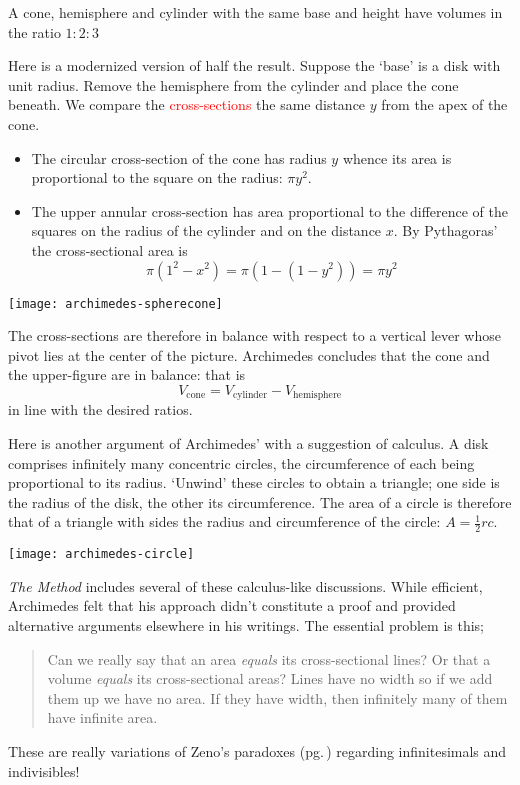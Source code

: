 \begin{thm*}{}{}
	A cone, hemisphere and cylinder with the same base and height have volumes in the ratio $1:2:3$
\end{thm*}
\label{pg:archmethod}

\begin{minipage}[t]{0.67\linewidth}\vspace{0pt}
	Here is a modernized version of half the result.\smallbreak
	Suppose the `base' is a disk with unit radius. Remove the hemisphere from the cylinder and place the cone beneath. We compare the \textcolor{red}{cross-sections} the same distance $y$ from the apex of the cone.
	\begin{itemize}\itemsep0pt
	  \item The circular cross-section of the cone has radius $y$ whence its area is proportional to the square on the radius: $\pi y^2$.
		\item The upper annular cross-section has area proportional to the difference of the squares on the radius of the cylinder and on the distance $x$. By Pythagoras' the cross-sectional area is
		\[
			\pi(1^2-x^2)=\pi(1-(1-y^2))=\pi y^2
		\]
	\end{itemize}
\end{minipage}
\hfill
\begin{minipage}[t]{0.32\linewidth}\vspace{0pt}
	\flushright
	\texttt{[image: archimedes-spherecone]}
\end{minipage}
The cross-sections are therefore in balance with respect to a vertical lever whose pivot lies at the center of the picture. Archimedes concludes that the cone and the upper-figure are in balance: that is
\[
	V_\text{cone}=V_\text{cylinder}-V_\text{hemisphere}
\]
in line with the desired ratios.
\bigbreak


Here is another argument of Archimedes' with a suggestion of calculus. A disk comprises infinitely many concentric circles, the circumference of each being proportional to its radius. `Unwind' these circles to obtain a triangle; one side is the radius of the disk, the other its circumference. The area of a circle is therefore that of a triangle with sides the radius and circumference of the circle: $A=\frac 12rc$.
\begin{center}
	\texttt{[image: archimedes-circle]}
\end{center}

\emph{The Method} includes several of these calculus-like discussions. While efficient, Archimedes felt that his approach didn't constitute a proof and provided alternative arguments elsewhere in his writings. The essential problem is this;
\begin{quote}
  Can we really say that an area \emph{equals} its cross-sectional lines? Or that a volume \emph{equals} its cross-sectional areas? Lines have no width so if we add them up we have no area. If they have width, then infinitely many of them have infinite area.
\end{quote}
These are really variations of Zeno's paradoxes (pg.\,\pageref{pg:zeno}) regarding infinitesimals and indivisibles!
\goodbreak

